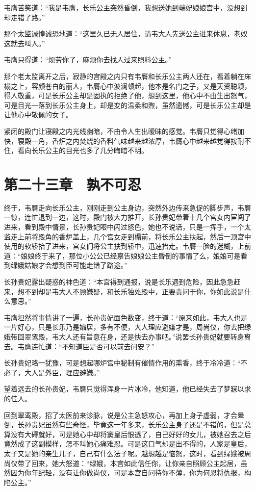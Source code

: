 韦膺苦笑道：“我是韦膺，长乐公主突然昏倒，我想送她到端妃娘娘宫中，没想到却走错了路。”

那个太监诚惶诚恐地道：“这里久已无人居住，请韦大人先送公主进来休息，老奴这就去叫人。”

韦膺只得道：“烦劳你了，麻烦你去找人过来照料公主。”

那个老太监离开之后，寂静的宫殿之内只有韦膺和长乐公主两人还在，看着躺在床榻之上，容颜苍白的丽人，韦膺心中波澜顿起，他本是名门之子，又是天资聪颖，得人敬重，可是长乐公主却是固执的拒绝了他，想到这里，他心中不由生出怒气，可是目光一落到长乐公主身上，却是变的温柔和煦，虽然遗憾，可是长乐公主却是让他心中敬佩的女子。

紧闭的殿门让寝殿之内光线幽暗，不由令人生出暧昧的感觉。韦膺只觉得心绪加快，寝殿一角，香炉之内焚烧的香料气味越来越浓厚，韦膺心中越来越觉得按耐不住，看向长乐公主的目光也多了几分晦暗不明。

\chapter{第二十三章　孰不可忍}

终于，韦膺走向长乐公主，刚刚走到公主身边，突然外边传来急促的脚步声，韦膺一惊，连忙退到一边，这时，殿门被大力推开，长孙贵妃带着十几个宫女内宦闯了进来，看到殿中情景，长孙贵妃眼中闪过怒色，她也不说话，只是一挥手，一个太监走上前将殿角的香炉盖上，几个宫女走到榻前，将长乐公主扶起，然后一顶宫中使用的软轿抬了进来，宫女们将公主扶到轿中，迅速抬走。韦膺一脸的迷糊，上前道：“娘娘终于来了，那位小公公已经禀告娘娘公主昏倒的事情了么，娘娘可是看到绿娥姑娘才会想到臣可能走错了路途。”

长孙贵妃露出疑惑的神色道：“本宫得到通报，说是长乐遇到危险，因此急急赶来，想不到却是韦大人不顾嫌疑，和长乐独处殿中，正要责问于你，你如此说是什么意思。”

韦膺坦然将事情讲了一遍，长孙贵妃面色数变，终于道：“原来如此，韦大人也是一片好心，只是长乐乃是孀居，多有不便，大人理应避嫌才是，周尚仪，你去把绿娥带回翠鸾殿，韦大人还有旨意在身，还是快去办事吧。”说罢长孙贵妃就要转身离去。韦膺连忙道：“不知道臣是否可以前去问安？”

长孙贵妃略一犹豫，可是想起哪炉宫中秘制有催情作用的熏香，终于冷冷道：“不必了，大人是外臣，理应避嫌。”

望着远去的长孙贵妃，韦膺只觉得浑身一片冰冷，他知道，他已经失去了梦寐以求的佳人。

回到翠鸾殿，招了太医前来诊脉，说是公主急怒攻心，再加上身子虚弱，才会晕倒，长孙贵妃虽然有些奇怪，毕竟这一年多来，长乐公主身子还是不错的，但是总算没有大碍就好，可是她心中却将窦皇后恨透了，自己好好的女儿，被她召去之后竟然成了这副模样，怎不叫她心痛难忍。可是这口气却是出不得的，人家是皇后，太子又是她的亲生儿子，自己有什么法子呢。越想越是恼怒，这时，看到绿娥被周尚仪带了回来，她大怒道：“绿娥，本宫如此信任你，让你亲自照顾公主起居，虽然因为你年纪轻，没有让你做尚仪，可是本宫自问待你不薄，你为何恩将仇报，构陷公主。”

